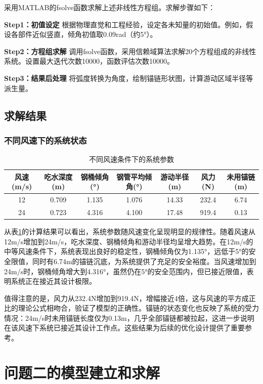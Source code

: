\documentclass[withoutpreface,bwprint]{cumcmthesis}
\begin{document}
采用MATLAB的fsolve函数求解上述非线性方程组。求解步骤如下：

\textbf{Step1：初值设定}
根据物理直觉和工程经验，设定各未知量的初始值。例如，假设各部件近似竖直，倾角初值取0.09rad（约5°）。

\textbf{Step2：方程组求解}
调用fsolve函数，采用信赖域算法求解20个方程组成的非线性系统。设置最大迭代次数10000，函数评估次数10000。

\textbf{Step3：结果后处理}
将弧度转换为角度，绘制锚链形状图，计算游动区域半径等派生量。

\subsection{求解结果}

\subsubsection{不同风速下的系统状态}

\begin{table}[H]
\centering
\begin{tabular}{ccccccc}
\toprule
风速(m/s) & 吃水深度(m) & 钢桶倾角(°) & 钢管平均倾角(°) & 游动半径(m) & 风力(N) & 未用锚链(m) \\
\midrule
12 & 0.709 & 1.135 & 1.076 & 14.33 & 232.4 & 6.74 \\
24 & 0.723 & 4.316 & 4.100 & 17.48 & 919.4 & 0.13 \\
\bottomrule
\end{tabular}
\caption{不同风速条件下的系统参数}
\label{tab:问题1结果}
\end{table}

从表\ref{tab:问题1结果}的计算结果可以看出，系统参数随风速变化呈现明显的规律性。随着风速从12m/s增加到24m/s，吃水深度、钢桶倾角和游动半径均呈增大趋势。在12m/s的中等风速条件下，系统表现出良好的稳定性，钢桶倾角仅为1.135°，远低于5°的安全限值，同时有6.74m的锚链沉底，为系统提供了充足的安全裕度。当风速增加到24m/s时，钢桶倾角增大到4.316°，虽然仍在5°的安全范围内，但已接近限值，表明系统正在接近其设计极限。

值得注意的是，风力从232.4N增加到919.4N，增幅接近4倍，这与风速的平方成正比的理论公式相吻合，验证了模型的正确性。锚链的状态变化也反映了系统的受力情况：24m/s时未用锚链长度仅为0.13m，几乎全部锚链都被拉起，这进一步说明在该风速下系统已接近其设计工作点。这些结果为后续的优化设计提供了重要参考。


\section{问题二的模型建立和求解}
\end{document}
